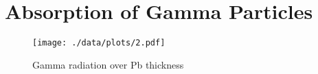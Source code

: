 \chapter{Absorption of Gamma Particles}

\begin{figure}[ht!]
	\centering
	\texttt{[image: ./data/plots/2.pdf]}
	\caption[Gamma radiation over Pb thickness]{Gamma radiation over Pb thickness}
	\label{fig:gamma_pb}
\end{figure}
